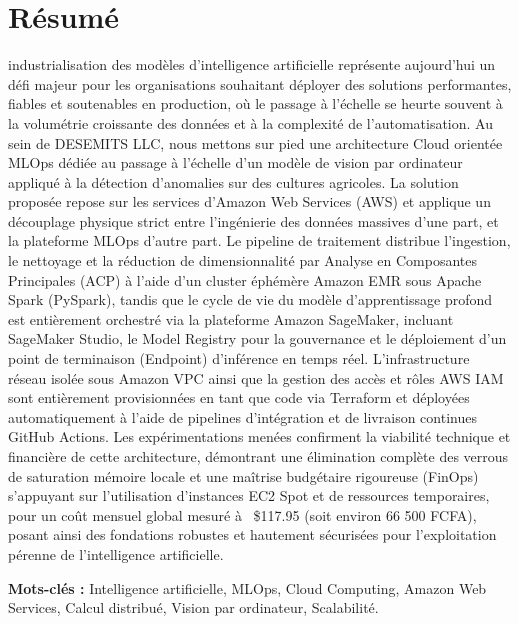 
\chapter*{Résumé}

industrialisation des modèles d’intelligence artificielle représente aujourd’hui un défi majeur pour les organisations souhaitant déployer des solutions performantes, fiables et soutenables en production, où le passage à l'échelle se heurte souvent à la volumétrie croissante des données et à la complexité de l'automatisation. Au sein de DESEMITS LLC, nous mettons sur pied une architecture Cloud orientée MLOps dédiée au passage à l’échelle d’un modèle de vision par ordinateur appliqué à la détection d’anomalies sur des cultures agricoles. La solution proposée repose sur les services d’Amazon Web Services (AWS) et applique un découplage physique strict entre l'ingénierie des données massives d'une part, et la plateforme MLOps d'autre part. Le pipeline de traitement distribue l'ingestion, le nettoyage et la réduction de dimensionnalité par Analyse en Composantes Principales (ACP) à l'aide d'un cluster éphémère Amazon EMR sous Apache Spark (PySpark), tandis que le cycle de vie du modèle d'apprentissage profond est entièrement orchestré via la plateforme Amazon SageMaker, incluant SageMaker Studio, le Model Registry pour la gouvernance et le déploiement d’un point de terminaison (Endpoint) d'inférence en temps réel. L’infrastructure réseau isolée sous Amazon VPC ainsi que la gestion des accès et rôles AWS IAM sont entièrement provisionnées en tant que code via Terraform et déployées automatiquement à l’aide de pipelines d'intégration et de livraison continues GitHub Actions. Les expérimentations menées confirment la viabilité technique et financière de cette architecture, démontrant une élimination complète des verrous de saturation mémoire locale et une maîtrise budgétaire rigoureuse (FinOps) s'appuyant sur l'utilisation d'instances EC2 Spot et de ressources temporaires, pour un coût mensuel global mesuré à ~\$117.95 (soit environ 66 500 FCFA), posant ainsi des fondations robustes et hautement sécurisées pour l'exploitation pérenne de l'intelligence artificielle.

\vspace{0.5cm}

\textbf{Mots-clés :} Intelligence artificielle, MLOps, Cloud Computing, Amazon Web Services, Calcul distribué, Vision par ordinateur, Scalabilité.

\clearpage